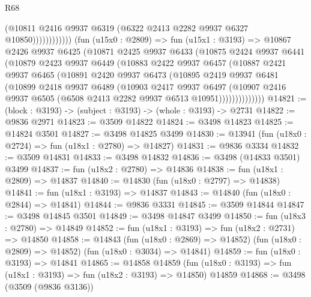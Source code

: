 \begin{lexlean}{R68}
\begin{coremodule}
                            (@10811
                              @2416
                              @9937
                              @6319
                              (@6322 @2413 @2282 @9937 @6327 @10850))))))))))))
        (fun (u15x0 : @2809) =>
        fun (u15x1 : @3193) =>
        @10867
          @2426
          @9937
          @6425
          (@10871
            @2425
            @9937
            @6433
            (@10875
              @2424
              @9937
              @6441
              (@10879
                @2423
                @9937
                @6449
                (@10883
                  @2422
                  @9937
                  @6457
                  (@10887
                    @2421
                    @9937
                    @6465
                    (@10891
                      @2420
                      @9937
                      @6473
                      (@10895
                        @2419
                        @9937
                        @6481
                        (@10899
                          @2418
                          @9937
                          @6489
                          (@10903
                            @2417
                            @9937
                            @6497
                            (@10907
                              @2416
                              @9937
                              @6505
                              (@6508 @2413 @2282 @9937 @6513 @10951))))))))))))))
@14821 := (block : @3193) -> (subject : @3193) -> (whole : @3193) -> @2731
@14822 := @9836 @2971
@14823 := @3509 @14822
@14824 := @3498 @14823
@14825 := @14824 @3501
@14827 := @3498 @14825 @3499
@14830 := @13941 (fun (u18x0 : @2724) => fun (u18x1 : @2780) => @14827)
@14831 := @9836 @3334
@14832 := @3509 @14831
@14833 := @3498 @14832
@14836 := @3498 (@14833 @3501) @3499
@14837 := fun (u18x2 : @2780) => @14836
@14838 := fun (u18x1 : @2809) => @14837
@14840 := @14830 (fun (u18x0 : @2797) => @14838)
@14841 := fun (u18x1 : @3193) => @14837
@14843 := @14840 (fun (u18x0 : @2844) => @14841)
@14844 := @9836 @3331
@14845 := @3509 @14844
@14847 := @3498 @14845 @3501
@14849 := @3498 @14847 @3499
@14850 := fun (u18x3 : @2780) => @14849
@14852 := fun (u18x1 : @3193) => fun (u18x2 : @2731) => @14850
@14858 := @14843
    (fun (u18x0 : @2869) => @14852)
    (fun (u18x0 : @2809) => @14852)
    (fun (u18x0 : @3034) => @14841)
@14859 := fun (u18x0 : @3193) => @14841
@14865 := @14858
    @14859
    (fun (u18x0 : @3193) => fun (u18x1 : @3193) => fun (u18x2 : @3193) => @14850)
    @14859
@14868 := @3498 (@3509 (@9836 @3136))

\end{coremodule}
\end{lexlean}
